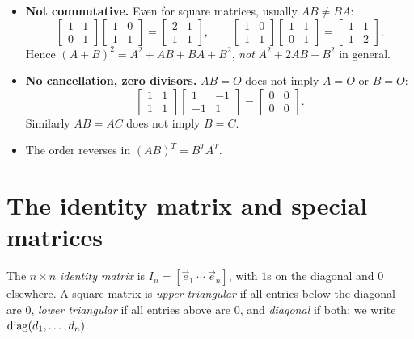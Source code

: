 \begin{important}
\begin{itemize}
  \item \textbf{Not commutative.} Even for square matrices, usually $AB\ne BA$:
  \[
  \begin{bmatrix}1&1\\0&1\end{bmatrix}\begin{bmatrix}1&0\\1&1\end{bmatrix}=\begin{bmatrix}2&1\\1&1\end{bmatrix},\qquad
  \begin{bmatrix}1&0\\1&1\end{bmatrix}\begin{bmatrix}1&1\\0&1\end{bmatrix}=\begin{bmatrix}1&1\\1&2\end{bmatrix}.
  \]
  Hence $(A+B)^2 = A^2+AB+BA+B^2$, \emph{not} $A^2+2AB+B^2$ in general.
  \item \textbf{No cancellation, zero divisors.} $AB=O$ does not imply $A=O$ or $B=O$:
  \[
  \begin{bmatrix}1&1\\1&1\end{bmatrix}\begin{bmatrix}1&-1\\-1&1\end{bmatrix}=\begin{bmatrix}0&0\\0&0\end{bmatrix}.
  \]
  Similarly $AB=AC$ does not imply $B=C$.
  \item The order reverses in $(AB)^T=B^TA^T$.
\end{itemize}
\end{important}

\section{The identity matrix and special matrices}

\begin{definition}
The $n\times n$ \emph{identity matrix} is $I_n=[\vec e_1\ \cdots\ \vec e_n]$, with $1$s on the
diagonal and $0$ elsewhere. A square matrix is \emph{upper triangular} if all entries below the
diagonal are $0$, \emph{lower triangular} if all entries above are $0$, and \emph{diagonal} if
both; we write $\operatorname{diag}(d_1,\dots,d_n)$.
\end{definition}

